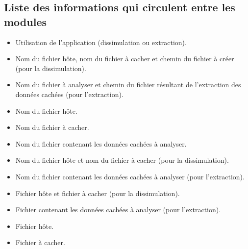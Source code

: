 \documentclass[11pt]{article}
\begin{document}
\subsection{Liste des informations qui circulent entre les modules}

\begin{multicols}{2}
\begin{description}
\footnotesize
\item[1)] 
\begin{itemize}
\item Utilisation de l'application (dissimulation ou extraction).
\item Nom du fichier hôte, nom du fichier à cacher et chemin du fichier à créer
    (pour la dissimulation).
\item Nom du fichier à analyser et chemin du fichier résultant de l'extraction
    des données cachées (pour l'extraction).
\end{itemize}
\item[2)] 
\begin{itemize}
\item Nom du fichier hôte.
\item Nom du fichier à cacher.
\end{itemize}
\item[3)] 
\begin{itemize}
\item Nom du fichier contenant les données cachées à analyser.
\end{itemize}
\item[4)] 
\begin{itemize}
\item Nom du fichier hôte et nom du fichier à cacher (pour la dissimulation).
\item Nom du fichier contenant les données cachées à analyser (pour
    l'extraction).
\end{itemize}
\item[5)]
\begin{itemize}
\item Fichier hôte et fichier à cacher (pour la dissimulation).
\item Fichier contenant les données cachées à analyser (pour l'extraction).
\end{itemize}
\item[6)]
\begin{itemize}
\item Fichier hôte.
\item Fichier à cacher.
\end{itemize}

\end{description}
\end{multicols}
\end{document}
